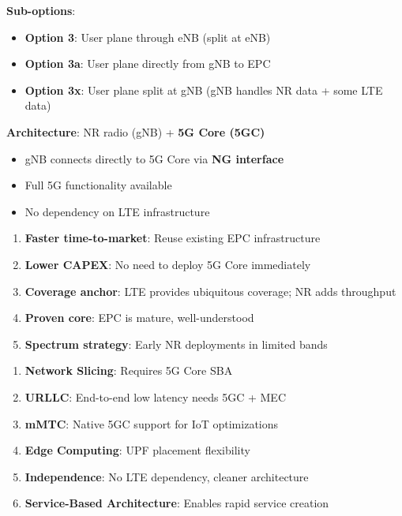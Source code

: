 \textbf{Sub-options}:

\begin{itemize}
\tightlist
\item
  \textbf{Option 3}: User plane through eNB (split at eNB)
\item
  \textbf{Option 3a}: User plane directly from gNB to EPC
\item
  \textbf{Option 3x}: User plane split at gNB (gNB handles NR data + some LTE data)
\end{itemize}


\textbf{Architecture}: NR radio (gNB) + \textbf{5G Core (5GC)}

\begin{itemize}
\tightlist
\item
  gNB connects directly to 5G Core via \textbf{NG interface}
\item
  Full 5G functionality available
\item
  No dependency on LTE infrastructure
\end{itemize}


\begin{enumerate}
\def\labelenumi{\arabic{enumi}.}
\tightlist
\item
  \textbf{Faster time-to-market}: Reuse existing EPC infrastructure
\item
  \textbf{Lower CAPEX}: No need to deploy 5G Core immediately
\item
  \textbf{Coverage anchor}: LTE provides ubiquitous coverage; NR adds throughput
\item
  \textbf{Proven core}: EPC is mature, well-understood
\item
  \textbf{Spectrum strategy}: Early NR deployments in limited bands
\end{enumerate}


\begin{enumerate}
\def\labelenumi{\arabic{enumi}.}
\tightlist
\item
  \textbf{Network Slicing}: Requires 5G Core SBA
\item
  \textbf{URLLC}: End-to-end low latency needs 5GC + MEC
\item
  \textbf{mMTC}: Native 5GC support for IoT optimizations
\item
  \textbf{Edge Computing}: UPF placement flexibility
\item
  \textbf{Independence}: No LTE dependency, cleaner architecture
\item
  \textbf{Service-Based Architecture}: Enables rapid service creation
\end{enumerate}

